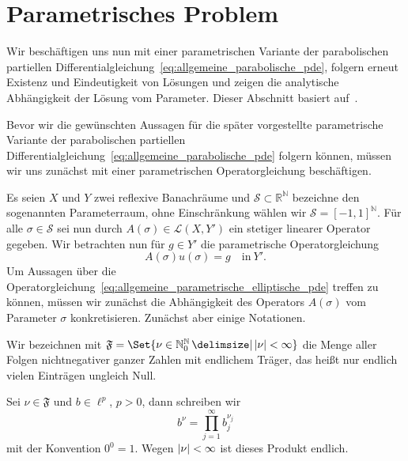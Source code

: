 \section{Parametrisches Problem} %
\label{sec:parametrisches_problem}

Wir beschäftigen uns nun mit einer parametrischen Variante der parabolischen partiellen Differentialgleichung~\eqref{eq:allgemeine_parabolische_pde}, folgern erneut Existenz und Eindeutigkeit von Lösungen und zeigen die analytische Abhängigkeit der Lösung vom Parameter.
Dieser Abschnitt basiert auf~\cite{Kunoth:2013ef}.

Bevor wir die gewünschten Aussagen für die später vorgestellte parametrische Variante der parabolischen partiellen Differentialgleichung~\eqref{eq:allgemeine_parabolische_pde} folgern können, müssen wir uns zunächst mit einer parametrischen Operatorgleichung beschäftigen.

Es seien $X$ und $Y$ zwei reflexive Banachräume und $\mathcal S \subset \mathbb{R}^{\mathbb{N}}$ bezeichne den sogenannten Parameterraum, ohne Einschränkung wählen wir $\mathcal S = {[-1, 1]}^{\mathbb{N}}$.
Für alle $\sigma \in \mathcal S$ sei nun durch $A(\sigma) \in \mathcal L(X, Y')$ ein stetiger linearer Operator gegeben.
Wir betrachten nun für $g \in Y'$ die parametrische Operatorgleichung
\begin{equation}
    \label{eq:allgemeine_parametrische_elliptische_pde}
    A(\sigma) u(\sigma) = g \quad \text{in}~Y'.
\end{equation}
Um Aussagen über die Operatorgleichung~\eqref{eq:allgemeine_parametrische_elliptische_pde} treffen zu können, müssen wir zunächst die Abhängigkeit des Operators $A(\sigma)$ vom Parameter $\sigma$ konkretisieren.
Zunächst aber einige Notationen.

\begin{Bemerkung}
    Wir bezeichnen mit $\mathfrak F = \Set{ \nu \in \mathbb{N}^{\mathbb{N}}_{0} \given \abs{\nu} < \infty }$ die Menge aller Folgen nichtnegativer ganzer Zahlen mit endlichem Träger, das heißt nur endlich vielen Einträgen ungleich Null.

    Sei $\nu \in \mathfrak F$ und $b \in \ell^{p}$, $p > 0$, dann schreiben wir
    \begin{equation}
        b^{\nu} = \prod_{j = 1}^{\infty} b_{j}^{\nu_{j}}
    \end{equation}
    mit der Konvention $0^{0} = 1$.
    Wegen $\lvert\nu\rvert < \infty$ ist dieses Produkt endlich.
\end{Bemerkung}


